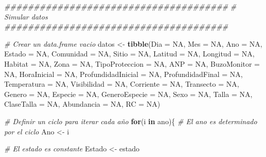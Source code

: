 \documentclass[]{krantz}
\makeatletter
\newenvironment{Shaded}{\begin{snugshade}}{\end{snugshade}}
\newcommand{\CommentTok}[1]{\textcolor[rgb]{0.56,0.35,0.01}{\textit{#1}}}
\newcommand{\ControlFlowTok}[1]{\textcolor[rgb]{0.13,0.29,0.53}{\textbf{#1}}}
\newcommand{\DataTypeTok}[1]{\textcolor[rgb]{0.13,0.29,0.53}{#1}}
\newcommand{\KeywordTok}[1]{\textcolor[rgb]{0.13,0.29,0.53}{\textbf{#1}}}
\newcommand{\NormalTok}[1]{#1}
\newcommand{\OtherTok}[1]{\textcolor[rgb]{0.56,0.35,0.01}{#1}}
\newcommand{\StringTok}[1]{\textcolor[rgb]{0.31,0.60,0.02}{#1}}
\newenvironment{kframe}{%
\medskip{}
\setlength{\fboxsep}{.8em}
 \def\at@end@of@kframe{}%
 \ifinner\ifhmode%
  \def\at@end@of@kframe{\end{minipage}}%
  \begin{minipage}{\columnwidth}%
 \fi\fi%
 \def\FrameCommand##1{\hskip\@totalleftmargin \hskip-\fboxsep
 \colorbox{shadecolor}{##1}\hskip-\fboxsep
     \hskip-\linewidth \hskip-\@totalleftmargin \hskip\columnwidth}%
 \MakeFramed {\advance\hsize-\width
   \@totalleftmargin\z@ \linewidth\hsize
   \@setminipage}}%
 {\par\unskip\endMakeFramed%
 \at@end@of@kframe}
\renewenvironment{Shaded}{\begin{kframe}}{\end{kframe}}
\makeatother
\begin{document}
\begin{Shaded}
\begin{Highlighting}[]
\CommentTok{######################################}
\CommentTok{# Simular datos}
\CommentTok{######################################}

\CommentTok{# Crear un data.frame vacio}
\NormalTok{datos <-}\StringTok{ }\KeywordTok{tibble}\NormalTok{(}\DataTypeTok{Dia =} \OtherTok{NA}\NormalTok{,}
                \DataTypeTok{Mes =} \OtherTok{NA}\NormalTok{,}
                \DataTypeTok{Ano =} \OtherTok{NA}\NormalTok{,}
                \DataTypeTok{Estado =} \OtherTok{NA}\NormalTok{,}
                \DataTypeTok{Comunidad =} \OtherTok{NA}\NormalTok{,}
                \DataTypeTok{Sitio =} \OtherTok{NA}\NormalTok{,}
                \DataTypeTok{Latitud =} \OtherTok{NA}\NormalTok{,}
                \DataTypeTok{Longitud =} \OtherTok{NA}\NormalTok{,}
                \DataTypeTok{Habitat =} \OtherTok{NA}\NormalTok{,}
                \DataTypeTok{Zona =} \OtherTok{NA}\NormalTok{,}
                \DataTypeTok{TipoProteccion =} \OtherTok{NA}\NormalTok{,}
                \DataTypeTok{ANP =} \OtherTok{NA}\NormalTok{,}
                \DataTypeTok{BuzoMonitor =} \OtherTok{NA}\NormalTok{,}
                \DataTypeTok{HoraInicial =} \OtherTok{NA}\NormalTok{,}
                \DataTypeTok{ProfundidadInicial =} \OtherTok{NA}\NormalTok{,}
                \DataTypeTok{ProfundidadFinal =} \OtherTok{NA}\NormalTok{,}
                \DataTypeTok{Temperatura =} \OtherTok{NA}\NormalTok{,}
                \DataTypeTok{Visibilidad =} \OtherTok{NA}\NormalTok{,}
                \DataTypeTok{Corriente =} \OtherTok{NA}\NormalTok{,}
                \DataTypeTok{Transecto =} \OtherTok{NA}\NormalTok{,}
                \DataTypeTok{Genero =} \OtherTok{NA}\NormalTok{,}
                \DataTypeTok{Especie =} \OtherTok{NA}\NormalTok{,}
                \DataTypeTok{GeneroEspecie =} \OtherTok{NA}\NormalTok{,}
                \DataTypeTok{Sexo =} \OtherTok{NA}\NormalTok{,}
                \DataTypeTok{Talla =} \OtherTok{NA}\NormalTok{,}
                \DataTypeTok{ClaseTalla =} \OtherTok{NA}\NormalTok{,}
                \DataTypeTok{Abundancia =} \OtherTok{NA}\NormalTok{,}
                \DataTypeTok{RC =} \OtherTok{NA}\NormalTok{)}

\CommentTok{# Definir un ciclo para iterar cada año}
\ControlFlowTok{for}\NormalTok{(i }\ControlFlowTok{in}\NormalTok{ ano)\{}
  \CommentTok{# El ano es determinado por el ciclo}
\NormalTok{  Ano <-}\StringTok{ }\NormalTok{i}
  
  \CommentTok{# El estado es constante}
\NormalTok{  Estado <-}\StringTok{ }\NormalTok{estado}
  

\end{Highlighting}
\end{Shaded}
\end{document}
